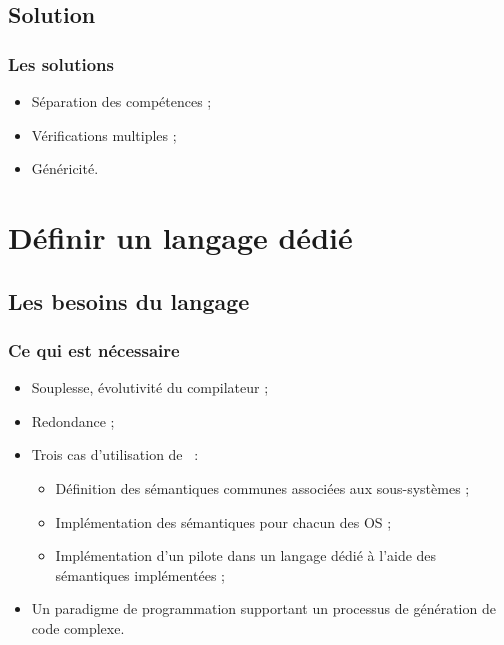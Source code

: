 \documentclass[]{beamer}
\begin{document}
\subsection{Solution}
\begin{frame}
\frametitle{Les solutions}
\begin{itemize}[<+->]
    \item Séparation des compétences ;
    \item Vérifications multiples ;
    \item Généricité.
\end{itemize}
\end{frame}



\section{Définir un langage dédié}

\subsection{Les besoins du langage}
\begin{frame}
\frametitle{Ce qui est nécessaire}
\begin{itemize}[<+->]
    \item Souplesse, évolutivité du compilateur ;
    \item Redondance ;
    \item Trois cas d'utilisation de \rtx\ :
        \begin{itemize}
            \item Définition des sémantiques communes associées aux
                  sous-systèmes ;
            \item Implémentation des sémantiques pour chacun des OS ;
            \item Implémentation d'un pilote dans un langage dédié à l'aide des
                  sémantiques implémentées ;
        \end{itemize}
    \item Un paradigme de programmation supportant un processus de génération
          de code complexe.
\end{itemize}
\end{frame}
\end{document}

